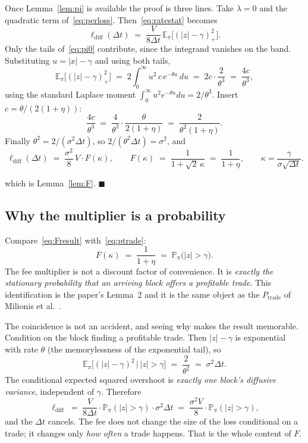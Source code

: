 \documentclass[11pt]{article}
\theoremstyle{definition}
\theoremstyle{remark}
\newcommand{\E}{\mathbb{E}}
\newcommand{\Prob}{\mathbb{P}}
\newcommand{\dt}{\Delta t}
\newcommand{\1}{\mathbf{1}}
\begin{document}
\noindent Once Lemma~\ref{lem:pi} is available the proof is three lines. Take $\lambda = 0$ and the quadratic term of~\eqref{eq:perloss}. Then~\eqref{eq:ratestat} becomes
\[
\ell_{\mathrm{diff}}(\dt) \;=\; \frac{V}{8\dt}\,\E_\pi\big[(|z|-\gamma)_+^2\big].
\]
Only the tails of~\eqref{eq:pi0} contribute, since the integrand vanishes on the band. Substituting $u = |x| - \gamma$ and using both tails,
\[
\E_\pi\big[(|z|-\gamma)_+^2\big] \;=\; 2\int_0^\infty u^2\,c\,e^{-\theta u}\,du \;=\; 2c\cdot\frac{2}{\theta^3} \;=\; \frac{4c}{\theta^3},
\]
using the standard Laplace moment $\int_0^\infty u^2 e^{-\theta u}du = 2/\theta^3$. Insert $c = \theta/(2(1+\eta))$:
\[
\frac{4c}{\theta^3} \;=\; \frac{4}{\theta^3}\cdot\frac{\theta}{2(1+\eta)} \;=\; \frac{2}{\theta^2(1+\eta)} .
\]
Finally $\theta^2 = 2/(\sigma^2\dt)$, so $2/(\theta^2\dt) = \sigma^2$, and
\begin{equation}\label{eq:Fresult}
\boxed{\;\ell_{\mathrm{diff}}(\dt) \;=\; \frac{\sigma^2}{8}\,V\cdot F(\kappa),
\qquad
F(\kappa) \;=\; \frac{1}{1+\sqrt2\,\kappa} \;=\; \frac{1}{1+\eta},
\qquad
\kappa = \frac{\gamma}{\sigma\sqrt{\dt}} . \;}
\end{equation}

which is Lemma~\ref{lem:F}. \qquad$\blacksquare$

\subsection{Why the multiplier is a probability}

Compare~\eqref{eq:Fresult} with~\eqref{eq:ptrade}:
\[
F(\kappa) \;=\; \frac{1}{1+\eta} \;=\; \Prob_\pi\big(|z| > \gamma\big).
\]
The fee multiplier is not a discount factor of convenience. It is \emph{exactly the stationary probability that an arriving block offers a profitable trade}. This identification is the paper's Lemma~2 and it is the same object as the $P_{\mathrm{trade}}$ of Milionis et al.~\cite{milionis2023automated}.

The coincidence is not an accident, and seeing why makes the result memorable. Condition on the block finding a profitable trade. Then $|z| - \gamma$ is exponential with rate $\theta$ (the memorylessness of the exponential tail), so
\[
\E_\pi\big[(|z|-\gamma)^2 \,\big|\, |z|>\gamma\big] \;=\; \frac{2}{\theta^2} \;=\; \sigma^2\dt .
\]
The conditional expected squared overshoot is \emph{exactly one block's diffusive variance}, independent of $\gamma$. Therefore
\[
\ell_{\mathrm{diff}} \;=\; \frac{V}{8\dt}\cdot \Prob_\pi(|z|>\gamma)\cdot\sigma^2\dt \;=\; \frac{\sigma^2 V}{8}\cdot\Prob_\pi(|z|>\gamma),
\]
and the $\dt$ cancels. The fee does not change the size of the loss conditional on a trade; it changes only \emph{how often} a trade happens. That is the whole content of $F$.
\end{document}
